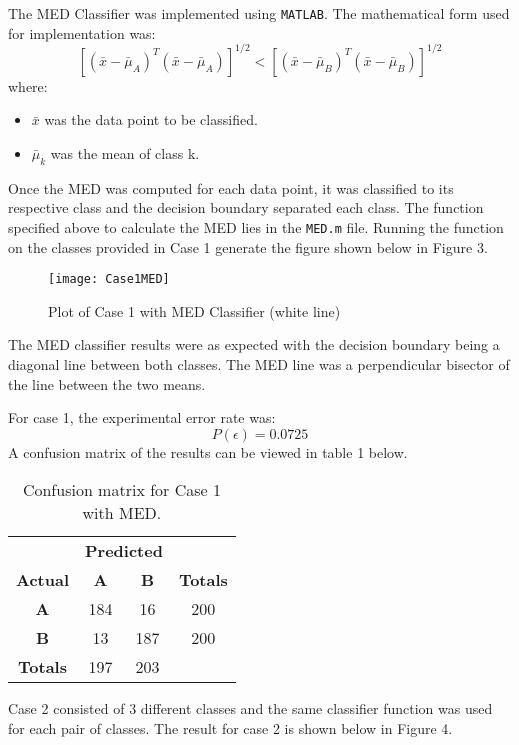 \documentclass{article}
\begin{document}
The MED Classifier was implemented using \verb|MATLAB|. The mathematical form used for implementation was:
\[[(\bar{x} - \bar{\mu}_{A})^{T}(\bar{x} - \bar{\mu}_{A})]^{1/2} <
    [(\bar{x} - \bar{\mu}_{B})^{T}(\bar{x} - \bar{\mu}_{B})]^{1/2}\]
where:
\begin{itemize}
    \item {$\bar{x}$ was the data point to be classified.}
    \item {$\bar{\mu}_k$ was the mean of class k.}
\end{itemize}


Once the MED was computed for each data point, it was classified to its respective class and the decision boundary separated each class. The function specified above to calculate the MED lies in the \verb|MED.m| file. Running the function on the classes provided in Case 1 generate the figure shown below in Figure 3.

\begin{figure}[H]
\caption{Plot of Case 1 with MED Classifier (white line)}
\centering
\texttt{[image: Case1MED]}
\label{fig:Case1_MED}
\end{figure}

The MED classifier results were as expected with the decision boundary being a diagonal line between both classes. The MED line was a perpendicular bisector of the line between the two means.

For case 1, the experimental error rate was:
\[P(\epsilon) = 0.0725\]
A confusion matrix of the results can be viewed in table 1 below.

\begin{table}[H]
    \centering
    \begin{tabular}{c|c c|c|}
        & \multicolumn{2}{c|}{\textbf{Predicted}} \\
        \textbf{Actual} & \textbf{A} & \textbf{B} & \textbf{Totals} \\
        \hline
        \textbf{A} & 184 \cellcolor[gray]{.8} & 16 & 200\\
        \textbf{B} & 13 & 187 \cellcolor[gray]{.8} & 200\\\hline
        \textbf{Totals} & 197 & 203\\
        \cline{1-3}
    \end{tabular}
    \caption{Confusion matrix for Case 1 with MED.}
    \label{tab:Case1_MED_error}
\end{table}

Case 2 consisted of 3 different classes and the same classifier function was used for each pair of classes. The result for case 2 is shown below in Figure 4.
\end{document}
